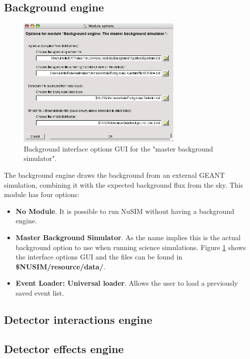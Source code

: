\subsection{Background engine}
\begin{figure}[tb]
\begin{center}
\includegraphics[width=8cm]{images/backgroundgui.png}  
\caption{Background interface options GUI for the "master background simulator".}
\label{bkggui} 
\end{center}
\end{figure}
The background engine draws the background from an external GEANT simulation, combining it with the expected background flux from the sky. This module has four options:
\begin{itemize}
\item \textbf{No Module}. It is possible to run NuSIM without having a background engine.
\item \textbf{Master Background Simulator}. As the name implies this is the actual background option to use when running science simulations. Figure \ref{bkggui} shows the interface options GUI and the files can be found in \textbf{\${NUSIM}/resource/data/}.
\item \textbf{Event Loader: Universal loader}. Allows the user to load a previously saved event list.
\end{itemize}
\subsection{Detector interactions engine}


\subsection{Detector effects engine}

